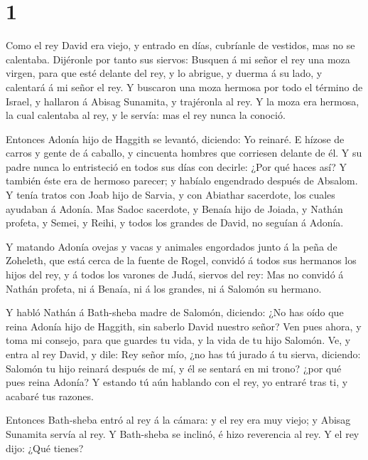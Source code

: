 \hypertarget{section}{%
\section{1}\label{section}}

 Como el rey David era viejo, y entrado en días, cubríanle
de vestidos, mas no se calentaba.  Dijéronle por tanto sus
siervos: Busquen á mi señor el rey una moza virgen, para que esté
delante del rey, y lo abrigue, y duerma á su lado, y calentará á mi
señor el rey.  Y buscaron una moza hermosa por todo el
término de Israel, y hallaron á Abisag Sunamita, y trajéronla al rey.
 Y la moza era hermosa, la cual calentaba al rey, y le
servía: mas el rey nunca la conoció.

 Entonces Adonía hijo de Haggith se levantó, diciendo: Yo
reinaré. E hízose de carros y gente de á caballo, y cincuenta hombres
que corriesen delante de él.  Y su padre nunca lo
entristeció en todos sus días con decirle: ¿Por qué haces así? Y también
éste era de hermoso parecer; y habíalo engendrado después de Absalom.
 Y tenía tratos con Joab hijo de Sarvia, y con Abiathar
sacerdote, los cuales ayudaban á Adonía.  Mas Sadoc
sacerdote, y Benaía hijo de Joiada, y Nathán profeta, y Semei, y Reihi,
y todos los grandes de David, no seguían á Adonía.

 Y matando Adonía ovejas y vacas y animales engordados junto
á la peña de Zoheleth, que está cerca de la fuente de Rogel, convidó á
todos sus hermanos los hijos del rey, y á todos los varones de Judá,
siervos del rey:  Mas no convidó á Nathán profeta, ni á
Benaía, ni á los grandes, ni á Salomón su hermano.

 Y habló Nathán á Bath-sheba madre de Salomón, diciendo:
¿No has oído que reina Adonía hijo de Haggith, sin saberlo David nuestro
señor?  Ven pues ahora, y toma mi consejo, para que guardes
tu vida, y la vida de tu hijo Salomón.  Ve, y entra al rey
David, y dile: Rey señor mío, ¿no has tú jurado á tu sierva, diciendo:
Salomón tu hijo reinará después de mí, y él se sentará en mi trono? ¿por
qué pues reina Adonía?  Y estando tú aún hablando con el
rey, yo entraré tras ti, y acabaré tus razones.

 Entonces Bath-sheba entró al rey á la cámara: y el rey era
muy viejo; y Abisag Sunamita servía al rey.  Y Bath-sheba
se inclinó, é hizo reverencia al rey. Y el rey dijo: ¿Qué tienes?

